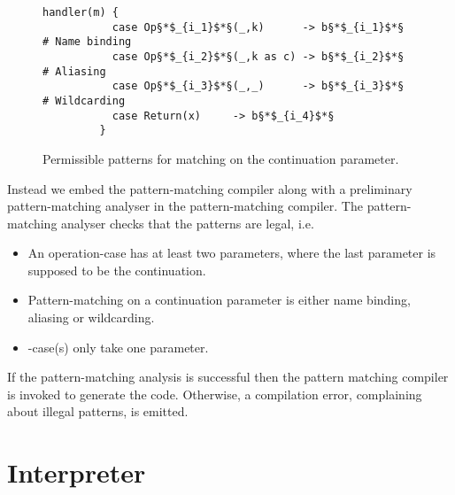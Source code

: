 \begin{figure}[H]
\begin{center}
\begin{lstlisting}[style=links]
         handler(m) {
           case Op§*$_{i_1}$*§(_,k)      -> b§*$_{i_1}$*§  # Name binding
           case Op§*$_{i_2}$*§(_,k as c) -> b§*$_{i_2}$*§  # Aliasing
           case Op§*$_{i_3}$*§(_,_)      -> b§*$_{i_3}$*§  # Wildcarding
           case Return(x)     -> b§*$_{i_4}$*§
         }
\end{lstlisting}        
\end{center}
\caption{Permissible patterns for matching on the continuation parameter.}\label{fig:cont-pattern-matching}
\end{figure}

Instead we embed the  pattern-matching compiler along with a preliminary pattern-matching analyser in the  pattern-matching compiler. The pattern-matching analyser checks that the patterns are legal, i.e.
\begin{itemize}
  \item An operation-case has at least two parameters, where the last parameter is supposed to be the continuation.
  \item Pattern-matching on a continuation parameter is either name binding, aliasing or wildcarding.
  \item {}-case(s) only take one parameter.
\end{itemize}
If the pattern-matching analysis is successful then the  pattern matching compiler is invoked to generate the code. Otherwise, a compilation error, complaining about illegal patterns, is emitted.

\section{Interpreter}

